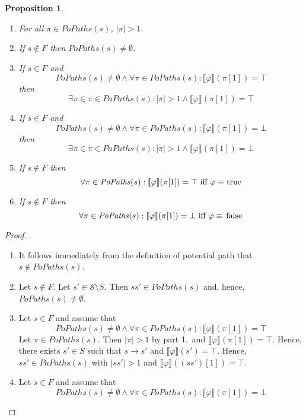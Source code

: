 \documentclass[12pt]{article}
\newcommand{\TRUE}{\mbox{\lstinline{true}}}
\newcommand{\FALSE}{\mbox{\lstinline{false}}}
\newtheorem{proposition}{Proposition}
\theoremstyle{definition}
\newcommand{\satisfaction}[1]{\llbracket #1 \rrbracket}
\newcommand{\bottom}{\mathord{\perp}}
\newenvironment{franck}{\color{red}}{\color{black}}
\begin{document}
\begin{franck}
\begin{proposition}\ 
\begin{enumerate}
\item 
For all $\pi \in \mathit{PoPaths}(s)$, $|\pi| > 1$.
\item
If $s \not\in F$ then $\mathit{PoPaths}(s) \not= \emptyset$.
\item
If $s \in F$ and 
\[
\mathit{PoPaths}(s) \not= \emptyset \wedge \forall \pi \in \mathit{PoPaths}(s) : \satisfaction{\varphi}(\pi[1]) = \top
\]
then
\[
\exists \pi \in \pi \in \mathit{PaPaths}(s) : |\pi| > 1 \wedge \satisfaction{\varphi}(\pi[1]) = \top
\]
\item
If $s \in F$ and 
\[
\mathit{PoPaths}(s) \not= \emptyset \wedge \forall \pi \in \mathit{PoPaths}(s) : \satisfaction{\varphi}(\pi[1]) = \bottom
\]
then
\[
\exists \pi \in \pi \in \mathit{PaPaths}(s) : |\pi| > 1 \wedge \satisfaction{\varphi}(\pi[1]) = \bottom
\]
\item
If $s \not\in F$ then 
\[
\forall \pi \in \mathit{PoPaths}(s) : \satisfaction{\varphi}(\pi[1]) = \top
\mbox{ iff }
\varphi \equiv \TRUE
\]
\item
If $s \not\in F$ then 
\[
\forall \pi \in \mathit{PoPaths}(s) : \satisfaction{\varphi}(\pi[1]) = \bottom
\mbox{ iff }
\varphi \equiv \FALSE
\]
\end{enumerate}
\end{proposition}
\begin{proof}\
\begin{enumerate}
\item
It follows immediately from the definition of potential path that $s \not\in \mathit{PoPaths}(s)$.
\item
Let $s \not\in F$.  Let $s' \in \mathcal{S} \setminus S$.  Then $s s' \in \mathit{PoPaths}(s)$ and, hence, $\mathit{PoPaths}(s) \not= \emptyset$. 
\item 
Let $s \in F$ and assume that
\[
\mathit{PoPaths}(s) \not= \emptyset \wedge \forall \pi \in \mathit{PoPaths}(s) : \satisfaction{\varphi}(\pi[1]) = \top
\]
Let $\pi \in \mathit{PoPaths}(s)$.  Then $|\pi| > 1$ by part 1.\ and $\satisfaction{\varphi}(\pi[1]) = \top$.  Hence, there exists $s' \in S$ such that $s \rightarrow s'$ and $\satisfaction{\varphi}(s') = \top$.  Hence, $s s' \in \mathit{PaPaths}(s)$ with $|s s'| > 1$ and $\satisfaction{\varphi}((s s')[1]) = \top$.
\item 
Let $s \in F$ and assume that
\[
\mathit{PoPaths}(s) \not= \emptyset \wedge \forall \pi \in \mathit{PoPaths}(s) : \satisfaction{\varphi}(\pi[1]) = \bottom
\]
\end{enumerate}
\end{proof}
\end{franck}
\end{document}
